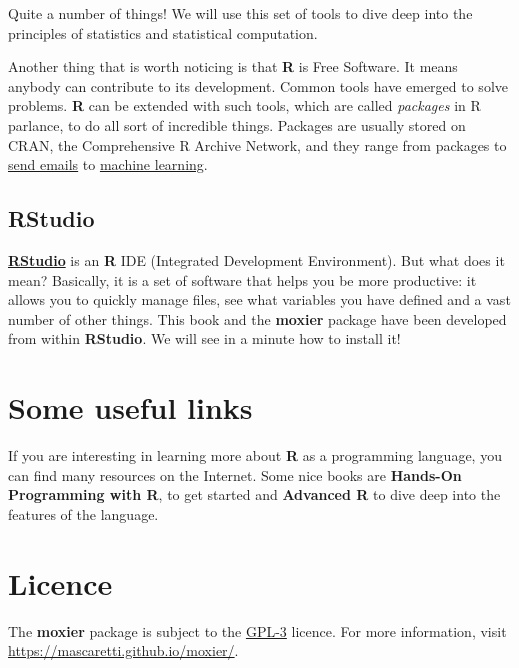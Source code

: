 \documentclass[
]{book}
\begin{document}
Quite a number of things! We will use this set of tools to dive deep into the principles of statistics and statistical computation.

Another thing that is worth noticing is that \textbf{R} is Free Software. It means anybody can contribute to its development. Common tools have emerged to solve problems. \textbf{R} can be extended with such tools, which are called \emph{packages} in R parlance, to do all sort of incredible things. Packages are usually stored on CRAN, the Comprehensive R Archive Network, and they range from packages to \href{https://rich-iannone.github.io/blastula/}{send emails} to \href{https://cran.r-project.org/web/views/MachineLearning.html}{machine learning}.

\hypertarget{rstudio}{%
\subsection{RStudio}\label{rstudio}}

\href{https://rstudio.com/}{\textbf{RStudio}} is an \textbf{R} IDE (Integrated Development Environment). But what does it mean? Basically, it is a set of software that helps you be more productive: it allows you to quickly manage files, see what variables you have defined and a vast number of other things. This book and the \textbf{moxier} package have been developed from within \textbf{RStudio}. We will see in a minute how to install it!

\hypertarget{some-useful-links}{%
\section{Some useful links}\label{some-useful-links}}

If you are interesting in learning more about \textbf{R} as a programming language, you can find many resources on the Internet.
Some nice books are \textbf{Hands-On Programming with R}, \citep{grolemund2014} to get started and \textbf{Advanced R} \citep{wickham2019} to dive deep into the features of the language.

\hypertarget{licence}{%
\section{Licence}\label{licence}}

The \textbf{moxier} package is subject to the \href{https://www.r-project.org/Licenses/GPL-3}{GPL-3} licence. For more information, visit \url{https://mascaretti.github.io/moxier/}.
\end{document}
